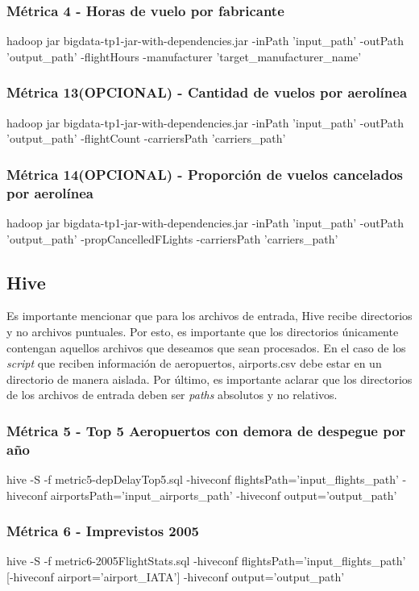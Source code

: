 \documentclass[a4paper,10pt]{article}
\begin{document}
        \subsubsection{Métrica 4 - Horas de vuelo por fabricante}
            \footnotesize{hadoop jar bigdata-tp1-jar-with-dependencies.jar -inPath 'input\_path' -outPath 'output\_path' -flightHours -manufacturer 'target\_manufacturer\_name'}
       \subsubsection{Métrica 13(OPCIONAL) - Cantidad de vuelos por aerolínea}
            \footnotesize{hadoop jar bigdata-tp1-jar-with-dependencies.jar -inPath 'input\_path' -outPath 'output\_path' -flightCount -carriersPath 'carriers\_path'}
        \subsubsection{Métrica 14(OPCIONAL) - Proporción de vuelos cancelados por aerolínea}
            \footnotesize{hadoop jar bigdata-tp1-jar-with-dependencies.jar -inPath 'input\_path' -outPath 'output\_path' -propCancelledFLights -carriersPath 'carriers\_path'}

    \subsection{Hive}
        Es importante mencionar que para los archivos de entrada, Hive recibe directorios y no archivos puntuales. Por esto, es importante que los directorios únicamente contengan aquellos archivos que deseamos que sean procesados. En el caso de los \textit{script} que reciben información de aeropuertos, airports.csv debe estar en un directorio de manera aislada.
        Por último, es importante aclarar que los directorios de los archivos de entrada deben ser \textit{paths} absolutos y no relativos.
        \subsubsection{Métrica 5 - Top 5 Aeropuertos con demora de despegue por año}
        \footnotesize{hive -S -f metric5-depDelayTop5.sql -hiveconf flightsPath='input\_flights\_path' -hiveconf airportsPath='input\_airports\_path' -hiveconf output='output\_path'}
        \subsubsection{Métrica 6 - Imprevistos 2005}
        \footnotesize{hive -S -f metric6-2005FlightStats.sql -hiveconf flightsPath='input\_flights\_path' [-hiveconf airport='airport\_IATA'] -hiveconf output='output\_path'}
\end{document}
